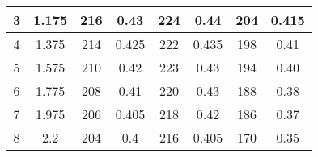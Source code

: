\begin{table}[hbt!]
\begin{tabular}{|c|c|cc|cc|cc|}
3                                                                     & 1.175                                                                            & \multicolumn{1}{c|}{216}      & 0.43    & \multicolumn{1}{c|}{224}                                & 0.44                              & \multicolumn{1}{c|}{204}                                 & 0.415                              \\ \hline
4                                                                     & 1.375                                                                            & \multicolumn{1}{c|}{214}      & 0.425   & \multicolumn{1}{c|}{222}                                & 0.435                             & \multicolumn{1}{c|}{198}                                 & 0.41                               \\ \hline
5                                                                     & 1.575                                                                            & \multicolumn{1}{c|}{210}      & 0.42    & \multicolumn{1}{c|}{223}                                & 0.43                              & \multicolumn{1}{c|}{194}                                 & 0.40                               \\ \hline
6                                                                     & 1.775                                                                            & \multicolumn{1}{c|}{208}      & 0.41    & \multicolumn{1}{c|}{220}                                & 0.43                              & \multicolumn{1}{c|}{188}                                 & 0.38                               \\ \hline
7                                                                     & 1.975                                                                            & \multicolumn{1}{c|}{206}      & 0.405   & \multicolumn{1}{c|}{218}                                & 0.42                              & \multicolumn{1}{c|}{186}                                 & 0.37                               \\ \hline
8                                                                     & 2.2                                                                              & \multicolumn{1}{c|}{204}      & 0.4     & \multicolumn{1}{c|}{216}                                & 0.405                             & \multicolumn{1}{c|}{170}                                 & 0.35                               \\ \hline
\end{tabular}

\end{table}



